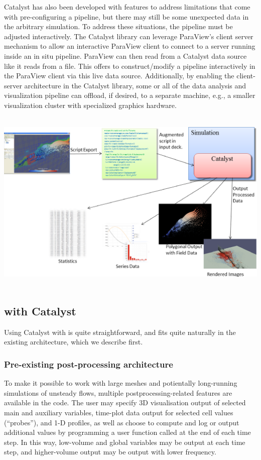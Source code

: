 Catalyst has also been developed with features to address limitations that come with pre-configuring a pipeline, but there may still be some unexpected data in the arbitrary simulation. To address these situations, the pipeline must be adjusted interactively.
The Catalyst library can leverage ParaView's client server mechanism to allow an interactive ParaView client to connect to a server running inside an in situ pipeline. ParaView can then read from a Catalyst data source like it reads from a file. This offers to construct/modify a pipeline interactively in the ParaView client via this live data source. Additionally, by enabling the client-server architecture in the Catalyst library, some or all of the data analysis and visualization pipeline can offload, if desired, to a separate machine, e.g., a smaller visualization cluster with specialized graphics hardware.

~\
\includegraphics[scale=0.47]{pictures/CatalystFullWorkFlow.eps}
\label{fig:catalyst}
\vspace{+0.04in}
~\

\subsection{\CS with Catalyst}

Using Catalyst with \CS is quite straightforward, and fits
quite naturally in the existing architecture, which we describe first.

\subsubsection{Pre-existing post-processing architecture}

To make it possible to work with large meshes and potientally long-running
simulations of unsteady flows, multiple postprocessing-related features
are available in the code. The user may specify 3D visualisation
output of selected main and auxiliary variables, time-plot data output
for selected cell values (``probes''), and 1-D profiles, as well as
choose to compute and log or output additional values by programming
a user function called at the end of each time step.
In this way, low-volume and global variables may be output
at each time step, and higher-volume output may be output with lower
frequency.

